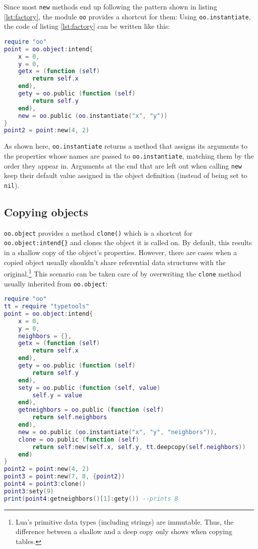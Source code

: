 Since most \texttt{new} methods end up following the pattern shown in listing \ref{lst:factory}, the module \texttt{oo} provides a shortcut for them: Using \texttt{oo.instantiate}, the code of listing \ref{lst:factory} can be written like this:

\begin{lstlisting}[language=lua, caption={Rewriting listing \ref{lst:factory} using \texttt{oo.instantiate}}, label=lst:instantiate, name=lst:instantiate]
require "oo"
point = oo.object:intend{
	x = 0,
	y = 0,
	getx = (function (self)
		return self.x
	end),
	gety = oo.public (function (self)
		return self.y
	end),
	new = oo.public (oo.instantiate("x", "y"))
}
point2 = point:new(4, 2)
\end{lstlisting}

As shown here, \texttt{oo.instantiate} returns a method that assigns its arguments to the properties whose names are passed to \texttt{oo.instantiate}, matching them by the order they appear in. Arguments at the end that are left out when calling \texttt{new} keep their default value assigned in the object definition (instead of being set to \texttt{nil}).

\subsection{Copying objects}
\label{sec:oo:copying}
\texttt{oo.object} provides a method \texttt{clone()} which is a shortcut for \texttt{oo.object:intend\{\}} and clones the object it is called on. By default, this results in a shallow copy of the object's properties. However, there are cases when a copied object usually shouldn't share referential data structures with the original.\footnote{Lua's primitive data types (including strings) are immutable. Thus, the difference between a shallow and a deep copy only shows when copying tables.} This scenario can be taken care of by overwriting the \texttt{clone} method usually inherited from \texttt{oo.object}:

\begin{lstlisting}[language=lua, caption={Overwriting the \texttt{clone} method}, label=lst:clone, name=lst:clone]
require "oo"
tt = require "typetools"
point = oo.object:intend{
	x = 0,
	y = 0,
	neighbors = {},
	getx = (function (self)
		return self.x
	end),
	gety = oo.public (function (self)
		return self.y
	end),
	sety = oo.public (function (self, value)
		self.y = value
	end),
	getneighbors = oo.public (function (self)
		return self.neighbors
	end),
	new = oo.public (oo.instantiate("x", "y", "neighbors")),
	clone = oo.public (function (self)
		return self:new(self.x, self.y, tt.deepcopy(self.neighbors))
	end)
}
point2 = point:new(4, 2)
point3 = point:new(7, 8, {point2})
point4 = point3:clone()
point3:sety(9)
print(point4:getneighbors()[1]:gety()) --prints 8

\end{lstlisting}

